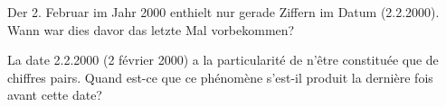 Der 2. Februar im Jahr 2000 enthielt nur gerade Ziffern im Datum (2.2.2000). Wann war dies davor das letzte Mal vorbekommen?

\bigskip

La date 2.2.2000 (2 février 2000) a la particularité de n'être constituée que de chiffres pairs. Quand est-ce que ce phénomène s'est-il produit la dernière fois avant cette date?